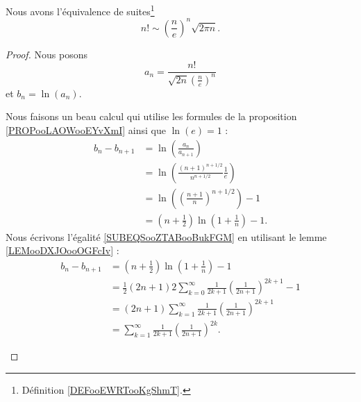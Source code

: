 \begin{lemma}        \label{LemCEoBqrP}
	Nous avons l'équivalence de suites\footnote{Définition \ref{DEFooEWRTooKgShmT}.}
	\begin{equation}
		n!\sim \left( \frac{ n }{ e } \right)^n\sqrt{2\pi n}.
	\end{equation}
\end{lemma}

\begin{proof}
	Nous posons
	\begin{equation}
		a_n=\frac{ n! }{ \sqrt{ 2n } \left( \frac{ n }{ e } \right)^n }
	\end{equation}
	et \( b_n=\ln(a_n)\).
	\begin{subproof}
		Nous faisons un beau calcul qui utilise les formules de la proposition \ref{PROPooLAOWooEYvXmI} ainsi que \( \ln(e)=1\) :
		\begin{subequations}        \label{SUBEQSooZTABooBukFGM}
			\begin{align}
				b_n-b_{n+1} & =\ln\left( \frac{ a_n }{ a_{n+1} } \right)                                 \\
				            & =\ln\left(     \frac{ (n+1)^{n+1/2} }{ n^{n+1/2} }\frac{1}{ e }    \right) \\
				            & =\ln\left( (\frac{ n+1 }{ n })^{n+1/2} \right)-1                           \\
				            & =\left( n+\frac{1}{ 2 } \right)\ln(1+\frac{1}{ n })-1.
			\end{align}
		\end{subequations}
		Nous écrivons l'égalité \eqref{SUBEQSooZTABooBukFGM} en utilisant le lemme \ref{LEMooDXJOooOGFcIv} :
		\begin{subequations}
			\begin{align}
				b_n-b_{n+1} & =(n+\frac{ 1 }{2})\ln(1+\frac{1}{ n })-1                                                         \\
				            & =\frac{ 1 }{2}(2n+1)2\sum_{k=0}^{\infty}\frac{1}{ 2k+1 }\left( \frac{1}{ 2n+1 } \right)^{2k+1}-1 \\
				            & =(2n+1)\sum_{k=1}^{\infty}\frac{1}{ 2k+1 }\left( \frac{1}{ 2n+1 } \right)^{2k+1}                 \\
				            & =\sum_{k=1}^{\infty}  \frac{1}{ 2k+1 }  \left( \frac{1}{ 2n+1 } \right)^{2k}.

\end{align}
\end{subequations}
\end{subproof}
\end{proof}
